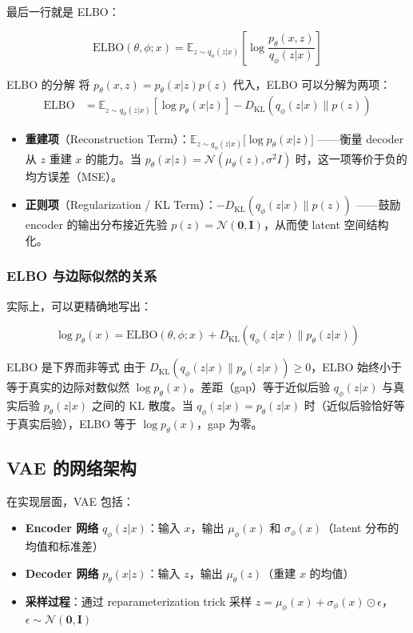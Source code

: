 \documentclass[a4paper]{article}
\begin{document}
最后一行就是 ELBO：

$$\text{ELBO}(\theta, \phi; x) = \mathbb{E}_{z \sim q_\phi(z|x)} \left[\log \frac{p_\theta(x, z)}{q_\phi(z|x)}\right]$$

\begin{importantbox}{ELBO 的分解}
将 $p_\theta(x, z) = p_\theta(x|z)p(z)$ 代入，ELBO 可以分解为两项：
\begin{align}
\text{ELBO} &= \mathbb{E}_{z \sim q_\phi(z|x)} \left[\log p_\theta(x|z)\right] - D_{\mathrm{KL}}(q_\phi(z|x) \| p(z)) \nonumber
\end{align}
\begin{itemize}
    \item \textbf{重建项}（Reconstruction Term）：$\mathbb{E}_{z \sim q_\phi(z|x)} {[}\log p_\theta(x|z){]}$ ——衡量 decoder 从 $z$ 重建 $x$ 的能力。当 $p_\theta(x|z) = \mathcal{N}(\mu_\theta(z), \sigma^2 I)$ 时，这一项等价于负的均方误差（MSE）。
    \item \textbf{正则项}（Regularization / KL Term）：$-D_{\mathrm{KL}}(q_\phi(z|x) \| p(z))$ ——鼓励 encoder 的输出分布接近先验 $p(z) = \mathcal{N}(\mathbf{0}, \mathbf{I})$，从而使 latent 空间结构化。
\end{itemize}
\end{importantbox}

\subsubsection{ELBO 与边际似然的关系}

实际上，可以更精确地写出：

$$\log p_\theta(x) = \text{ELBO}(\theta, \phi; x) + D_{\mathrm{KL}}(q_\phi(z|x) \| p_\theta(z|x))$$

\begin{warningbox}{ELBO 是下界而非等式}
由于 $D_{\mathrm{KL}}(q_\phi(z|x) \| p_\theta(z|x)) \geq 0$，ELBO 始终小于等于真实的边际对数似然 $\log p_\theta(x)$。差距（gap）等于近似后验 $q_\phi(z|x)$ 与真实后验 $p_\theta(z|x)$ 之间的 KL 散度。当 $q_\phi(z|x) = p_\theta(z|x)$ 时（近似后验恰好等于真实后验），ELBO 等于 $\log p_\theta(x)$，gap 为零。
\end{warningbox}

\subsection{VAE 的网络架构}

在实现层面，VAE 包括：

\begin{itemize}
    \item \textbf{Encoder 网络} $q_\phi(z|x)$：输入 $x$，输出 $\mu_\phi(x)$ 和 $\sigma_\phi(x)$（latent 分布的均值和标准差）
    \item \textbf{Decoder 网络} $p_\theta(x|z)$：输入 $z$，输出 $\mu_\theta(z)$（重建 $x$ 的均值）
    \item \textbf{采样过程}：通过 reparameterization trick 采样 $z = \mu_\phi(x) + \sigma_\phi(x) \odot \epsilon$，$\epsilon \sim \mathcal{N}(\mathbf{0}, \mathbf{I})$
\end{itemize}
\end{document}
